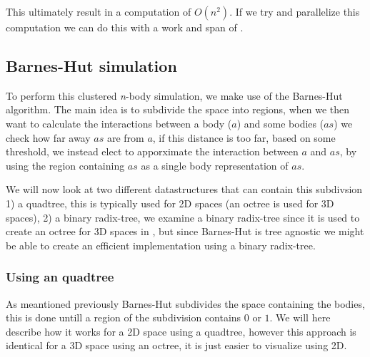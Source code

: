This ultimately result in a computation of $O(n^2)$.
If we try and parallelize this computation we can do this with a work and span of .

\subsection{Barnes-Hut simulation}
To perform this clustered \textit{n}-body simulation, we make use of the
Barnes-Hut algorithm\cite{BH-algo}. The main idea is to subdivide the space into
regions, when we then want to calculate the interactions between a body ($a$)
and some bodies ($as$) we check how far away $as$ are from $a$, if this distance
is too far, based on some threshold, we instead elect to apporximate the
interaction between $a$ and $as$, by using the region containing $as$ as a
single body representation of $as$.

We will now look at two different datastructures that can contain this subdivsion
1) a quadtree, this is typically used for 2D spaces (an octree is used for 3D
spaces), 2) a binary radix-tree, we examine a binary radix-tree since it is used
to create an octree for 3D spaces in \cite{main-ref}, but since Barnes-Hut is
tree agnostic we might be able to create an efficient implementation using a
binary radix-tree.

\subsubsection{Using an quadtree}
As meantioned previously Barnes-Hut subdivides the space containing the bodies,
this is done untill a region of the subdivision contains $0$ or $1$. We will here
describe how it works for a 2D space using a quadtree, however this approach is
identical for a 3D space using an octree, it is just easier to visualize using
2D.

